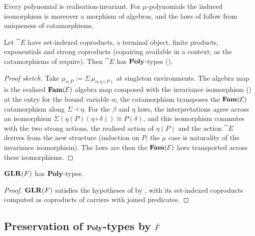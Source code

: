 \begin{lemma}
\label{lem:conservativity:realisation-invariance}
Every polynomial is realisation-invariant. For $\mu$-polynomials the induced isomorphism is
moreover a morphism of algebras, and the laws of  follow from
uniqueness of
catamorphisms.
\end{lemma}

\begin{theorem}[Transfer]
\label{thm:conservativity:transfer}
Let $\cat{E}$ have set-indexed coproducts, a terminal object, finite products, exponentials and
strong coproducts (copairing available in a context, as the catamorphisms of
 require). Then $\cat{E}$ has $\mathbf{Poly}$-types
().
\end{theorem}

\begin{proof}[Proof sketch]
Take $\mu_{\alpha.P} := \Sigma\, \mu_{\alpha.\eta(P)}$ at singleton environments. The algebra
map is the realised $\mathbf{Fam}(\mathcal{E})$ algebra map composed with the invariance
isomorphism () at the entry for the bound variable
$\alpha$; the catamorphism transposes the
$\mathbf{Fam}(\mathcal{E})$ catamorphism along $\Sigma \dashv \eta$. For the $\beta$ and $\eta$ laws, the
interpretations agree across an isomorphism $\Sigma(\eta(P)(\eta \circ \delta)) \cong
P(\delta)$, and this isomorphism commutes with the two strong actions, the realised
action of $\eta(P)$ and the action $\cat{E}$ derives from the new structure (induction on $P$;
the $\mu$ case is naturality of the invariance isomorphism). The laws are then the
$\mathbf{Fam}(\mathcal{E})$ laws transported across these isomorphisms.
\end{proof}

\begin{corollary}
\label{cor:conservativity:glr-poly}
$\mathbf{GLR}(F)$ has $\mathbf{Poly}$-types.
\end{corollary}

\begin{proof}
$\mathbf{GLR}(F)$ satisfies the hypotheses of  by
, with its set-indexed coproducts computed as coproducts of carriers
with joined predicates.
\end{proof}

\subsection{Preservation of $\mathbf{Poly}$-types by $\hat{F}$}
\label{sec:conservativity:gf-poly-types}

